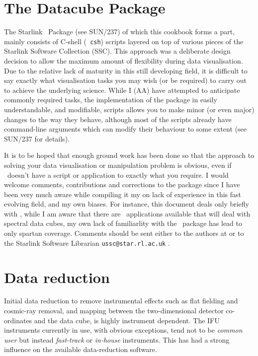 \documentclass[twoside,11pt]{article}
\newcommand{\htmladdnormallink}[2]{#1}
\newenvironment{latexonly}{}{}
\newcommand{\latex}[1]{#1}
\newcommand{\xref}[3]{#1}
\newcommand{\xlabel}[1]{}
\begin{document}
\section{\xlabel{sc16_datacubepackage}The Datacube Package\label{sc16_datacubepackage}}

The \htmladdnormallink{Starlink}{http://www.starlink.ac.uk/} 
\DATACUBEref\ Package 
\begin{latexonly}
(see SUN/237)
\end{latexonly}
of which this cookbook forms a part, mainly consists of C-shell ({\tt
csh}) scripts layered on top of various pieces of the Starlink
Software Collection (SSC).  This approach was a deliberate design
decision to allow the maximum amount of flexibility during data
visualisation.  Due to the relative lack of maturity in this still
developing field, it is difficult to say exactly what visualisation
tasks you may wish (or be required) to carry out to achieve the
underlying science.  While I (AA) have attempted to anticipate commonly
required tasks, the implementation of the package in easily
understandable, and modifiable, scripts allows you to make minor (or
even major) changes to the way they behave, although most of the
scripts already have \xref{command-line arguments}{sun237}{} which
can modify their behaviour to some extent\latex{ (see SUN/237 for
details)}.

It is to be hoped that enough ground work has been done so that the
approach to solving your data visualisation or manipulation problem is
obvious, even if \DATACUBE\ doesn't have a script or application to
exactly what you require.  I would welcome comments, contributions and
corrections to the package since I have been very much aware while
compiling it my on lack of experience in this fast evolving field, and
my own biases.  For instance, this document deals only briefly with
\IRAFref, while I am aware that there are \IRAF\ applications
available that will deal with spectral data cubes, my own lack of
familiarlity with the \IRAF\ package has lead to only spartan
coverage.  Comments should be sent either to the authors at or to
the Starlink Software Librarian
\htmladdnormallink{{\tt ussc@star.rl.ac.uk} }{mailto:ussc@star.rl.ac.uk}.

\section{\xlabel{sc16_reduction}Data reduction\label{sc16_reduction}}

Initial data reduction to remove instrumental effects such as flat
fielding and cosmic-ray removal, and mapping between the
two-dimensional detector co-ordinates and the data cube, is highly
instrument dependent.  The IFU instruments currently in use, with
obvious exceptions, tend not to be {\em common user} but instead {\em
fast-track} or {\em in-house} instruments.  This has had a strong
influence on the available data-reduction software.
\end{document}
